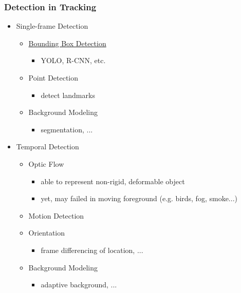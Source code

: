 \subsubsection{Detection in Tracking}
\begin{itemize}
\item Single-frame Detection
	\begin{itemize}
	\item \hyperref[DL_CV_Objdet]{Bounding Box Detection}
		\begin{itemize}
		\item YOLO, R-CNN, etc.
		\end{itemize}
	\item Point Detection
		\begin{itemize}
		\item detect landmarks
		\end{itemize}
	\item Background Modeling
		\begin{itemize}
		\item segmentation, ...
		\end{itemize}
	\end{itemize}
\item Temporal Detection
	\begin{itemize}
	\item Optic Flow
		\begin{itemize}
		\item able to represent non-rigid, deformable object
		\item yet, may failed in moving foreground (e.g. birds, fog, smoke...)
		\end{itemize}
	\item Motion Detection
	\item Orientation
		\begin{itemize}
		\item frame differencing of location, ...
		\end{itemize}
	\item Background Modeling
		\begin{itemize}
		\item adaptive background, ...
		\end{itemize}
	\end{itemize}
\end{itemize}

